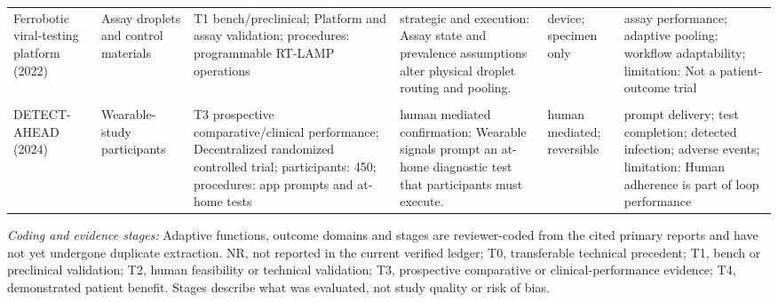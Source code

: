 \begin{longtable}{L{0.15\textwidth} L{0.13\textwidth} L{0.17\textwidth} L{0.17\textwidth} L{0.12\textwidth} L{0.14\textwidth}}
Ferrobotic viral-testing platform (2022) \cite{lin2022ferrobotic} & Assay droplets and control materials & T1 bench/preclinical; Platform and assay validation; procedures: programmable RT-LAMP operations & strategic and execution: Assay state and prevalence assumptions alter physical droplet routing and pooling. & device; specimen only & assay performance; adaptive pooling; workflow adaptability; limitation: Not a patient-outcome trial \\
\addlinespace[2pt]\\
DETECT-AHEAD (2024) \cite{quer2024detectahead} & Wearable-study participants & T3 prospective comparative/clinical performance; Decentralized randomized controlled trial; participants: 450; procedures: app prompts and at-home tests & human mediated confirmation: Wearable signals prompt an at-home diagnostic test that participants must execute. & human mediated; reversible & prompt delivery; test completion; detected infection; adverse events; limitation: Human adherence is part of loop performance \\
\end{longtable}
\noindent\footnotesize\textit{Coding and evidence stages:} Adaptive functions, outcome domains and stages are reviewer-coded from the cited primary reports and have not yet undergone duplicate extraction. NR, not reported in the current verified ledger; T0, transferable technical precedent; T1, bench or preclinical validation; T2, human feasibility or technical validation; T3, prospective comparative or clinical-performance evidence; T4, demonstrated patient benefit. Stages describe what was evaluated, not study quality or risk of bias.
\endgroup

